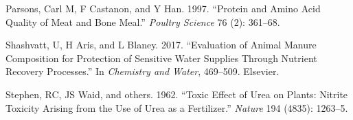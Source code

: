 \documentclass[
]{article}
\newlength{\cslhangindent}
\newenvironment{cslreferences}%
  {\setlength{\parindent}{0pt}%
  \everypar{\setlength{\hangindent}{\cslhangindent}}\ignorespaces}%
  {\par}
\begin{document}
\begin{cslreferences}
\leavevmode\hypertarget{ref-parsons1997protein}{}%
Parsons, Carl M, F Castanon, and Y Han. 1997. ``Protein and Amino Acid Quality of Meat and Bone Meal.'' \emph{Poultry Science} 76 (2): 361--68.

\leavevmode\hypertarget{ref-shashvatt2017evaluation}{}%
Shashvatt, U, H Aris, and L Blaney. 2017. ``Evaluation of Animal Manure Composition for Protection of Sensitive Water Supplies Through Nutrient Recovery Processes.'' In \emph{Chemistry and Water}, 469--509. Elsevier.

\leavevmode\hypertarget{ref-stephen1962toxic}{}%
Stephen, RC, JS Waid, and others. 1962. ``Toxic Effect of Urea on Plants: Nitrite Toxicity Arising from the Use of Urea as a Fertilizer.'' \emph{Nature} 194 (4835): 1263--5.
\end{cslreferences}
\end{document}
